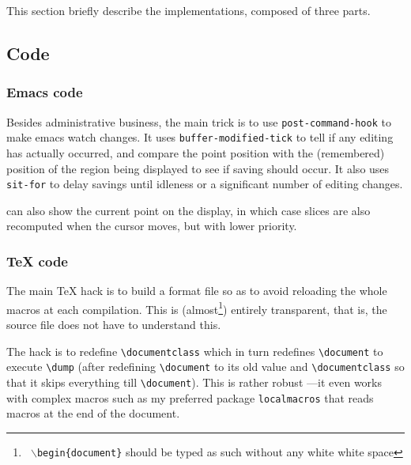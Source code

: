 \documentclass{article}
\let \lst \verb
\let \whizzy \WhizzyTeX
\begin{document}
This section briefly describe the implementations, composed of three parts.

\subsection {Code} 

\subsubsection* {Emacs code}

Besides administrative business, the main trick is to use 
\lst"post-command-hook" to make emacs watch changes. 
It uses \lst"buffer-modified-tick" to tell if any editing has actually
occurred, and compare the point position with the (remembered) position of
the region being displayed to see if saving should occur. It also uses
\lst"sit-for" to delay savings until idleness or a 
significant number of editing changes. 

{\whizzy} can also show the current point on the display, in which case
slices are also recomputed when the cursor moves, but with lower priority.

\subsubsection* {TeX code}

The main TeX hack is to build a format file so as to avoid reloading the
whole macros at each compilation. This is (almost\footnote{{\tt
$\backslash$begin\{document\}} should be typed as such without any white
white space}) entirely transparent, that is, the source file does not have
to understand this.

The hack is to redefine \lst"\documentclass" which in turn  redefines
\lst"\document" to execute \lst"\dump" (after redefining \lst"\document"
to its old value and \lst"\documentclass" so that it skips everything till
\lst"\document"). This is rather robust ---it even works with 
complex macros such as my preferred package \lst"localmacros" that reads
macros at the end of the document.
\end{document}
